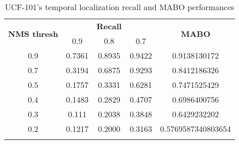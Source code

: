 \begin{center}
  \begin{longtable}{|| c || c c c | c |}
    \hline
    \multirow{2}{*}{\textbf{NMS thresh}} & {} & {\textbf{Recall}} & {} & \multirow{2}{*}{\textbf{MABO}} \\
      {} & 0.9 & 0.8 & 0.7 & {} \\
      \hline
      0.9 & 0.7361 & 0.8935 & 0.9422 & 0.9138130172 \\
      \hline
      0.7 & 0.3194 & 0.6875 & 0.9293 & 0.8412186326 \\
      \hline
      0.5 & 0.1757 & 0.3331 & 0.6281 & 0.7471525429 \\
      \hline
      0.4 &0.1483 & 0.2829 & 0.4707 & 0.6986400756 \\
      \hline
      0.3 & 0.111 & 0.2038 & 0.3848 & 0.6429232202 \\
      \hline
      0.2 & 0.1217  & 0.2000 & 0.3163 & 0.5769587340803654 \\
      \hline
    \caption{UCF-101's temporal localization recall and MABO performances}
    \label{table:temp_cls_recall_1}
  \end{longtable}
\end{center}

